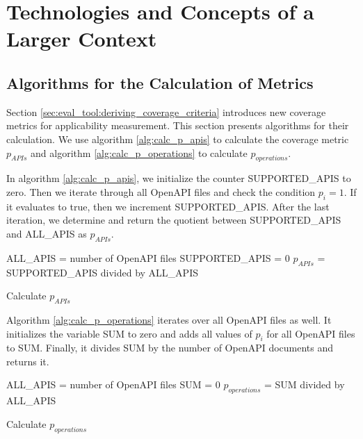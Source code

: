 
\cleardoublepage
\chapter{Technologies and Concepts of a Larger Context}
\label{appendix:A}
\section{Algorithms for the Calculation of Metrics}
\label{appendix:algorithms}
Section \ref{sec:eval_tool:deriving_coverage_criteria} introduces new coverage metrics for applicability measurement. This section presents algorithms for their calculation. We use algorithm \ref{alg:calc_p_apis} to calculate the coverage metric $p_{APIs}$ and algorithm \ref{alg:calc_p_operations} to calculate $p_{operations}$. 

In algorithm \ref{alg:calc_p_apis}, we initialize the counter SUPPORTED\_APIS to zero. Then we iterate through all OpenAPI files and check the condition \(p_{i}=1\). If it evaluates to true, then we increment SUPPORTED\_APIS. After the last iteration, we determine and return the quotient between SUPPORTED\_APIS and ALL\_APIS as \(p_{APIs}\). \\

\begin{algorithm}[H]
    ALL\_APIS = number of OpenAPI files\;
    SUPPORTED\_APIS = 0\;
    \(p_{APIs}\) = SUPPORTED\_APIS divided by ALL\_APIS \;
 \caption{Calculate \(p_{APIs}\) }
 \label{alg:calc_p_apis}
\end{algorithm}

Algorithm \ref{alg:calc_p_operations} iterates over all OpenAPI files as well. It initializes the variable SUM to zero and adds all values of \(p_{i}\) for all OpenAPI files to SUM. Finally, it divides SUM by the number of OpenAPI documents and returns it.

\begin{algorithm}[H]
    ALL\_APIS = number of OpenAPI files\;
    SUM = 0\;
    \(p_{operations}\) = SUM divided by ALL\_APIS \;
 \caption{Calculate \(p_{operations}\) }
 \label{alg:calc_p_operations}
\end{algorithm}



